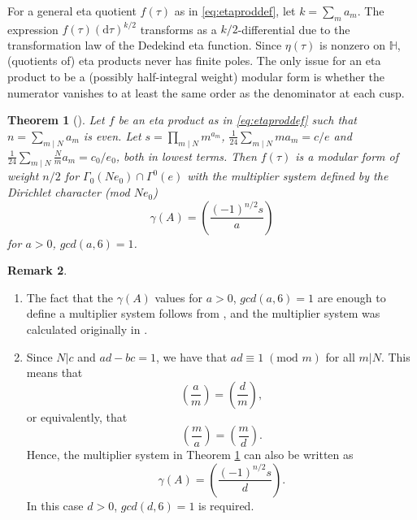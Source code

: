 \documentclass{article}
\newtheorem{theorem}{Theorem}[section]
\theoremstyle{definition}
\newtheorem{remark}[theorem]{Remark}
\begin{document}
For a general eta quotient $f(\tau)$ as in \eqref{eq:etaproddef}, let $k=\sum_m{a_m}$. The expression $f(\tau)(\mathrm{d}\tau)^{k/2}$ transforms as a $k/2$-differential due to the transformation law of the Dedekind eta function. Since $\eta(\tau)$ is nonzero on $\mathbb{H}$, (quotients of) eta products never has finite poles. The only issue for an eta product to be a (possibly half-integral weight) modular form is whether the numerator vanishes to at least the same order as the denominator at each cusp. 

\begin{theorem}[{\cite[Theorem 3]{gordon1993multiplicative}}] 
	\label{thm:etaprodmodeven}	
	Let $f$ be an eta product as in \eqref{eq:etaproddef} such that $n=\sum_{m \mid N} a_m$ is even. Let $s=\prod_{m \mid N} m^{a_m}$,  $\frac{1}{24}\sum_{m \mid N} ma_m=c/e$ and $\frac{1}{24}\sum_{m \mid N} \frac{N}{m}a_m=c_0/e_0$, both in lowest terms. Then $f(\tau)$ is a modular form of weight $n/2$ for $\Gamma_0(Ne_0)\cap\Gamma^0(e)$ with the multiplier system defined by the Dirichlet character (mod $Ne_0$)
	\[ \gamma(A)=\left( \frac{(-1)^{n/2} s}{a} \right) \]
	for $a>0$, $gcd(a,6)=1$.
\end{theorem}
\begin{remark}
	\label{rem:multsyst}
	\begin{enumerate}
		\item The fact that the $\gamma(A)$ values for $a>0$, $gcd(a,6)=1$ are enough to define a multiplier system follows from \cite[Lemma 3]{newman1959construction}, and the multiplier system was calculated originally in \cite[Theorem 1]{newman1959construction}.
		\item\label{it:multsyst2} Since $N|c$ and $ad-bc=1$, we have that $ad \equiv 1  \;(\textrm{mod }m)$ for all $m|N$. This means that
		\[ \left(\frac{a}{m}\right)=\left(\frac{d}{m}\right),\]
		or equivalently, that 
		\[ \left(\frac{m}{a}\right)=\left(\frac{m}{d}\right).\]
		Hence, the multiplier system in Theorem \ref{thm:etaprodmodeven} can also be written as 
		\[ \gamma(A)=\left( \frac{(-1)^{n/2} s}{d} \right). \]
		In this case $d>0$, $gcd(d,6)=1$ is required.
	\end{enumerate}
\end{remark}
\end{document}
